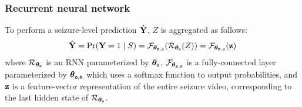 \subsubsection{Recurrent neural network}

To perform a seizure-level prediction $\hat{\Yb}$, $Z$ is aggregated as follows:
\begin{equation}
    \hat{\Yb}
    = \Pr(\Yb = 1 \mid S)
    = \Fzs( \Rs ( Z ) )
    = \Fzs( \z )
\end{equation}
where
$\Rs$ is an \ac{RNN} parameterized by $\pars{\sss}$,
$\Fzs$ is a fully-connected layer parameterized by $\pars{\z,\sss}$ which uses a softmax function to output probabilities,
and $\z$ is a feature-vector representation of the entire seizure video, corresponding to the last hidden state of $\Rs$.
